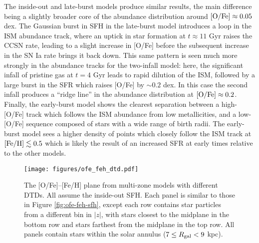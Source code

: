 \documentclass[twocolumn,twocolappendix,linenumbers,trackchanges]{aastex631}
\begin{document}
The inside-out and late-burst models produce similar results, the main difference being a slightly broader core of the abundance distribution around ${\rm [O/Fe]}\approx0.05$ dex. The Gaussian burst in SFH in the late-burst model introduces a loop in the ISM abundance track, where an uptick in star formation at $t\approx11$ Gyr raises the CCSN rate, leading to a slight increase in [O/Fe] before the subsequent increase in the SN Ia rate brings it back down. This same pattern is seen much more strongly in the abundance tracks for the two-infall model: here, the significant infall of pristine gas at $t=4$ Gyr leads to rapid dilution of the ISM, followed by a large burst in the SFR which raises [O/Fe] by $\sim 0.2$ dex. In this case the second infall produces a ``ridge line'' in the abundance distribution at ${\rm [O/Fe]}\approx 0.2$. Finally, the early-burst model shows the clearest separation between a high-[O/Fe] track which follows the ISM abundance from low metallicities, and a low-[O/Fe] sequence composed of stars with a wide range of birth radii. The early-burst model sees a higher density of points which closely follow the ISM track at ${\rm [Fe/H]}\lesssim 0.5$ which is likely the result of an increased SFR at early times relative to the other models.

\begin{figure*}
    \centering
    \texttt{[image: figures/ofe\_feh\_dtd.pdf]}
    \caption{The [O/Fe]--[Fe/H] plane from multi-zone models with different DTDs. All assume the inside-out SFH. Each panel is similar to those in Figure \ref{fig:ofe-feh-sfh}, except each row contains star particles from a different bin in $|z|$, with stars closest to the midplane in the bottom row and stars farthest from the midplane in the top row. All panels contain stars within the solar annulus ($7\leq R_{\rm gal}<9$ kpc).}
    \label{fig:ofe-feh-dtd}
\end{figure*}
\end{document}
